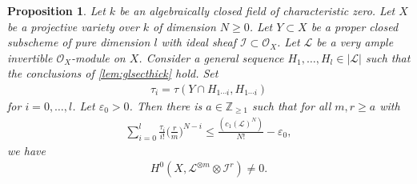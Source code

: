 \documentclass[12pt]{amsart}
\theoremstyle{plain}
\newtheorem{proposition}[theorem]{Proposition}
\theoremstyle{definition}
\numberwithin{equation}{section}
\def\Z{{\mathbb Z}}
\def\O{{ \mathcal{O}}}
\def\I{{ \mathcal{I}}}
\newcommand{\e}{\varepsilon}
\begin{document}
\begin{proposition}\label{prop:existencevansectau}
Let $k$ be an algebraically closed field of characteristic zero.
Let $X$ be a projective variety over $k$ of dimension $N \geq 0$.
Let $Y \subset X$ be a proper closed subscheme of pure dimension $l$ with ideal sheaf $ \I \subset \O_{X}$.
Let $ \mathcal{L}$ be a very ample invertible $\O_{X}$-module on $X$.
Consider a general sequence $H_{1}, \dots, H_{l} \in | \mathcal{L}|$ such that the conclusions of \cref{lem:glsecthick} hold.
Set 
\begin{align}
\tau_{i} = \tau(Y\cap  H_{1\cdots i} ,  H_{1\cdots i})
\end{align}
for $i=0,\dots, l$.
Let $\e_{0} > 0$.
Then there is $a \in \Z_{\geq 1}$ such that for all $m,r \geq a$ with
\begin{align}
\sum_{i=0}^{l} \frac{\tau_{i}}{i !} \bigg( \frac{r}{m} \bigg)^{N-i} \leq \frac{ (c_{1}( \mathcal{L})^{N}) }{N!} - \e_{0}, \label{eq:condonrm}
\end{align}
we have
\begin{align}
H^{0}(X, \mathcal{L}^{\otimes m} \otimes \I^{r}) \neq 0.
\end{align}
\end{proposition}
\end{document}
